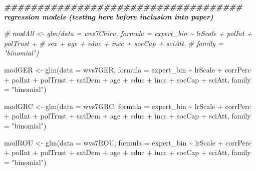 \documentclass[
  12pt,
  english,
]{article}
\newenvironment{Shaded}{\begin{snugshade}}{\end{snugshade}}
\newcommand{\AttributeTok}[1]{\textcolor[rgb]{0.77,0.63,0.00}{#1}}
\newcommand{\CommentTok}[1]{\textcolor[rgb]{0.56,0.35,0.01}{\textit{#1}}}
\newcommand{\DocumentationTok}[1]{\textcolor[rgb]{0.56,0.35,0.01}{\textbf{\textit{#1}}}}
\newcommand{\FunctionTok}[1]{\textcolor[rgb]{0.00,0.00,0.00}{#1}}
\newcommand{\NormalTok}[1]{#1}
\newcommand{\OtherTok}[1]{\textcolor[rgb]{0.56,0.35,0.01}{#1}}
\newcommand{\SpecialCharTok}[1]{\textcolor[rgb]{0.00,0.00,0.00}{#1}}
\newcommand{\StringTok}[1]{\textcolor[rgb]{0.31,0.60,0.02}{#1}}
\begin{document}
\begin{Shaded}
\begin{Highlighting}[]
\DocumentationTok{\#\#\#\#\#\#\#\#\#\#\#\#\#\#\#\#\#\#\#\#\#\#\#\#\#\#\#\#\#\#\#\#\#\#\#\# regression models (testing here before inclusion into paper)}

\CommentTok{\# modAll \textless{}{-} glm(data = wvs7Chiru, formula = expert\_bin \textasciitilde{} lrScale + polInt + polTrust +}
\CommentTok{\#               sex + age + educ + incc + socCap + sciAtt,}
\CommentTok{\#             family = "binomial")}

\NormalTok{modGER }\OtherTok{\textless{}{-}} \FunctionTok{glm}\NormalTok{(}\AttributeTok{data =}\NormalTok{ wvs7GER, }\AttributeTok{formula =}\NormalTok{ expert\_bin }\SpecialCharTok{\textasciitilde{}}\NormalTok{ lrScale }\SpecialCharTok{+}\NormalTok{ corrPerc }\SpecialCharTok{+}\NormalTok{ polInt }\SpecialCharTok{+}\NormalTok{ polTrust }\SpecialCharTok{+}
\NormalTok{                satDem }\SpecialCharTok{+}\NormalTok{ age }\SpecialCharTok{+}\NormalTok{ educ }\SpecialCharTok{+}\NormalTok{ incc }\SpecialCharTok{+}\NormalTok{ socCap }\SpecialCharTok{+}\NormalTok{ sciAtt, }\AttributeTok{family =} \StringTok{"binomial"}\NormalTok{)}

\NormalTok{modGRC }\OtherTok{\textless{}{-}} \FunctionTok{glm}\NormalTok{(}\AttributeTok{data =}\NormalTok{ wvs7GRC, }\AttributeTok{formula =}\NormalTok{ expert\_bin }\SpecialCharTok{\textasciitilde{}}\NormalTok{ lrScale }\SpecialCharTok{+}\NormalTok{ corrPerc }\SpecialCharTok{+}\NormalTok{ polInt }\SpecialCharTok{+}\NormalTok{ polTrust }\SpecialCharTok{+}
\NormalTok{                satDem }\SpecialCharTok{+}\NormalTok{ age }\SpecialCharTok{+}\NormalTok{ educ }\SpecialCharTok{+}\NormalTok{ incc }\SpecialCharTok{+}\NormalTok{ socCap }\SpecialCharTok{+}\NormalTok{ sciAtt, }\AttributeTok{family =} \StringTok{"binomial"}\NormalTok{)}

\NormalTok{modROU }\OtherTok{\textless{}{-}} \FunctionTok{glm}\NormalTok{(}\AttributeTok{data =}\NormalTok{ wvs7ROU, }\AttributeTok{formula =}\NormalTok{ expert\_bin }\SpecialCharTok{\textasciitilde{}}\NormalTok{ lrScale }\SpecialCharTok{+}\NormalTok{ corrPerc }\SpecialCharTok{+}\NormalTok{ polInt }\SpecialCharTok{+}\NormalTok{ polTrust }\SpecialCharTok{+}
\NormalTok{                satDem }\SpecialCharTok{+}\NormalTok{ age }\SpecialCharTok{+}\NormalTok{ educ }\SpecialCharTok{+}\NormalTok{ incc }\SpecialCharTok{+}\NormalTok{ socCap }\SpecialCharTok{+}\NormalTok{ sciAtt, }\AttributeTok{family =} \StringTok{"binomial"}\NormalTok{)}


\end{Highlighting}
\end{Shaded}
\end{document}
